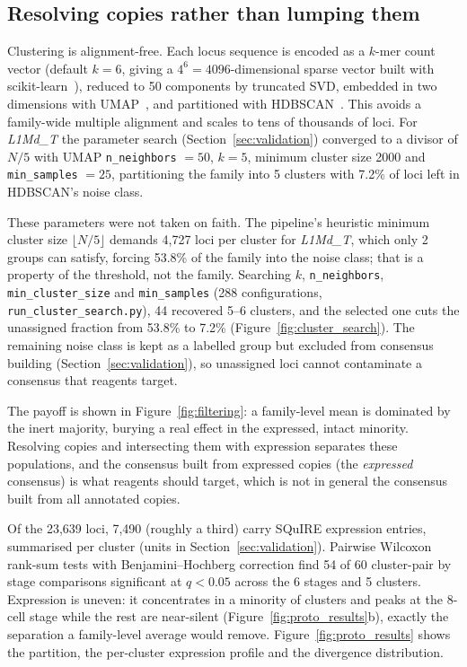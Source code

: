 \documentclass[11pt]{article}
\newcommand{\protoFamily}{L1Md\_T}
\newcommand{\protoLoci}{23,639}
\newcommand{\protoClusters}{\csClusters}
\newcommand{\protoExprLoci}{7,490}
\newcommand{\protoDESig}{\csDeSig}
\newcommand{\protoDETotal}{\csDeTotal}
\newcommand{\protoStages}{\csNStages}
\newcommand{\protoDivisor}{5}
\newcommand{\protoNeighbors}{\csNeighbors}
\newcommand{\protoKmer}{\csKmer}
\newcommand{\protoMinClusterSize}{\csMinClusterSize}
\newcommand{\protoMinSamples}{\csMinSamples}
\newcommand{\protoNoisePctMeasured}{\csNoisePct}
\newcommand{\oldClusters}{2}
\newcommand{\oldNoisePct}{53.8}
\newcommand{\oldMinClusterSize}{4,727}
\providecommand{\csClusters}{5}\providecommand{\csNoisePct}{7.2}
\providecommand{\csKmer}{5}\providecommand{\csNeighbors}{50}
\providecommand{\csMinClusterSize}{2000}\providecommand{\csMinSamples}{25}
\providecommand{\csNConfigs}{288}\providecommand{\csNInTarget}{44}
\providecommand{\csDeSig}{54}\providecommand{\csDeTotal}{60}
\providecommand{\csNStages}{6}\providecommand{\csReproARI}{(pending run)}
\begin{document}
\subsection{Resolving copies rather than lumping them}
\label{sec:resolve}

Clustering is alignment-free. Each locus sequence is encoded as a $k$-mer count vector
(default $k{=}6$, giving a $4^6 = 4096$-dimensional sparse vector built with
scikit-learn~\citep{pedregosa2011}), reduced to 50 components by truncated SVD, embedded in
two dimensions with UMAP~\citep{mcinnes2018umap}, and partitioned with
HDBSCAN~\citep{mcinnes2017hdbscan}. This avoids a family-wide multiple alignment and scales
to tens of thousands of loci. For \emph{\protoFamily} the parameter search
(Section~\ref{sec:validation}) converged to a divisor of $N/\protoDivisor{}$ with UMAP
\texttt{n\_neighbors} $=\protoNeighbors{}$, $k=\protoKmer{}$, minimum cluster size
\protoMinClusterSize{} and \texttt{min\_samples} $=\protoMinSamples{}$, partitioning the family
into \protoClusters{} clusters with \protoNoisePctMeasured\% of loci left in HDBSCAN's noise
class.

These parameters were not taken on faith. The pipeline's heuristic minimum cluster size
$\lfloor N/\protoDivisor \rfloor$ demands \oldMinClusterSize{} loci per cluster for
\emph{\protoFamily}, which only \oldClusters{} groups can satisfy, forcing \oldNoisePct\% of the
family into the noise class; that is a property of the threshold, not the family. Searching
$k$, \texttt{n\_neighbors}, \texttt{min\_cluster\_size} and \texttt{min\_samples}
(\csNConfigs{} configurations, \texttt{run\_cluster\_search.py}), \csNInTarget{} recovered
\protoClusters{}--6 clusters, and the selected one cuts the unassigned fraction from
\oldNoisePct\% to \protoNoisePctMeasured\% (Figure~\ref{fig:cluster_search}). The remaining
noise class is kept as a labelled group but excluded from consensus building
(Section~\ref{sec:validation}), so unassigned loci cannot contaminate a consensus that reagents
target.

The payoff is shown in Figure~\ref{fig:filtering}: a family-level mean is dominated by the
inert majority, burying a real effect in the expressed, intact minority. Resolving copies and
intersecting them with expression separates these populations, and the consensus built from
expressed copies (the \emph{expressed} consensus) is what reagents should target, which is not
in general the consensus built from all annotated copies.

Of the \protoLoci{} loci, \protoExprLoci{} (roughly a third) carry SQuIRE expression entries,
summarised per cluster (units in Section~\ref{sec:validation}). Pairwise Wilcoxon rank-sum tests
with Benjamini--Hochberg correction find \protoDESig{} of \protoDETotal{} cluster-pair by stage
comparisons significant at $q<0.05$ across the \protoStages{} stages and \protoClusters{}
clusters. Expression is uneven: it concentrates in a minority of clusters and peaks at the
8-cell stage while the rest are near-silent (Figure~\ref{fig:proto_results}b), exactly the
separation a family-level average would remove. Figure~\ref{fig:proto_results} shows the
partition, the per-cluster expression profile and the divergence distribution.
\end{document}
